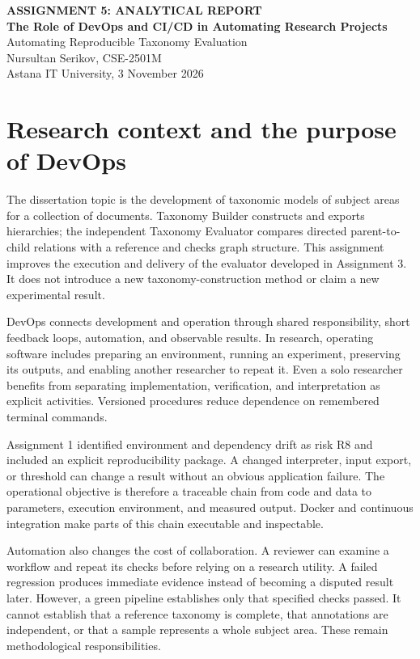 

\begin{center}
\textbf{ASSIGNMENT 5: ANALYTICAL REPORT}\\
\textbf{The Role of DevOps and CI/CD in Automating Research Projects}\\
Automating Reproducible Taxonomy Evaluation\\
Nursultan Serikov, CSE-2501M\\
Astana IT University, 3 November 2026
\end{center}

\section{Research context and the purpose of DevOps}
The dissertation topic is the development of taxonomic models of subject areas for a collection of documents. Taxonomy Builder constructs and exports hierarchies; the independent Taxonomy Evaluator compares directed parent-to-child relations with a reference and checks graph structure. This assignment improves the execution and delivery of the evaluator developed in Assignment 3. It does not introduce a new taxonomy-construction method or claim a new experimental result.

DevOps connects development and operation through shared responsibility, short feedback loops, automation, and observable results. In research, operating software includes preparing an environment, running an experiment, preserving its outputs, and enabling another researcher to repeat it. Even a solo researcher benefits from separating implementation, verification, and interpretation as explicit activities. Versioned procedures reduce dependence on remembered terminal commands.

Assignment 1 identified environment and dependency drift as risk R8 and included an explicit reproducibility package. A changed interpreter, input export, or threshold can change a result without an obvious application failure. The operational objective is therefore a traceable chain from code and data to parameters, execution environment, and measured output. Docker and continuous integration make parts of this chain executable and inspectable.

Automation also changes the cost of collaboration. A reviewer can examine a workflow and repeat its checks before relying on a research utility. A failed regression produces immediate evidence instead of becoming a disputed result later. However, a green pipeline establishes only that specified checks passed. It cannot establish that a reference taxonomy is complete, that annotations are independent, or that a sample represents a whole subject area. These remain methodological responsibilities.

